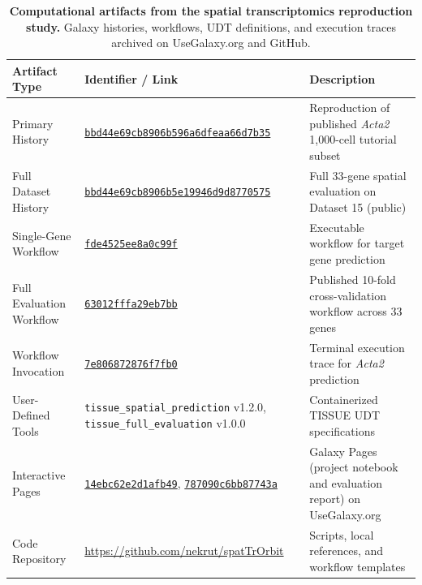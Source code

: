 \documentclass[11pt,letterpaper]{article}
\newcommand{\tool}[1]{\textsf{#1}}
\begin{document}
\begin{table}[!htbp]
\centering
\footnotesize
\begin{tabularx}{\textwidth}{p{}p{}X}
\toprule
\textbf{Artifact Type} & \textbf{Identifier / Link} & \textbf{Description} \\
\midrule
Primary History & \href{https://usegalaxy.org/histories/view?id=bbd44e69cb8906b596a6dfeaa66d7b35}{\texttt{bbd44e69cb8906b596a6dfeaa66d7b35}} & Reproduction of published \textit{Acta2} 1,000-cell tutorial subset \\
Full Dataset History & \href{https://usegalaxy.org/histories/view?id=bbd44e69cb8906b5e19946d9d8770575}{\texttt{bbd44e69cb8906b5e19946d9d8770575}} & Full 33-gene spatial evaluation on Dataset 15 (public) \\
Single-Gene Workflow & \href{https://usegalaxy.org/published/workflow?id=fde4525ee8a0c99f}{\texttt{fde4525ee8a0c99f}} & Executable workflow for target gene prediction \\
Full Evaluation Workflow & \href{https://usegalaxy.org/published/workflow?id=63012fffa29eb7bb}{\texttt{63012fffa29eb7bb}} & Published 10-fold cross-validation workflow across 33 genes \\
Workflow Invocation & \href{https://usegalaxy.org/workflows/invocations/7e806872876f7fb0}{\texttt{7e806872876f7fb0}} & Terminal execution trace for \textit{Acta2} prediction \\
User-Defined Tools & \nolinkurl{tissue_spatial_prediction} v1.2.0, \nolinkurl{tissue_full_evaluation} v1.0.0 & Containerized \tool{TISSUE} UDT specifications \\
Interactive Pages & \href{https://usegalaxy.org/published/page?id=14ebc62e2d1afb49}{\texttt{14ebc62e2d1afb49}}, \href{https://usegalaxy.org/published/page?id=787090c6bb87743a}{\texttt{787090c6bb87743a}} & Galaxy Pages (project notebook and evaluation report) on UseGalaxy.org \\
Code Repository & \url{https://github.com/nekrut/spatTrOrbit} & Scripts, local references, and workflow templates \\
\bottomrule
\end{tabularx}
\caption{\textbf{Computational artifacts from the spatial transcriptomics reproduction study.} Galaxy histories, workflows, UDT definitions, and execution traces archived on UseGalaxy.org and GitHub.}
\label{tab:case1_artifacts}
\end{table}

\clearpage
\end{document}
